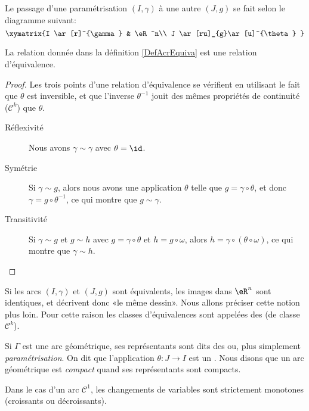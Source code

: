Le passage d'une paramétrisation $(I,\gamma)$ à une autre $(J,g)$ se fait selon le diagramme suivant:
\begin{equation}
    \xymatrix{%
    I \ar[r]^{\gamma}   &   \eR^n\\
    J \ar[ru]_{g}\ar[u]^{\theta}    
       }
\end{equation}

\begin{proposition}
    La relation donnée dans la définition \ref{DefAcrEquiva} est une relation d'équivalence.
\end{proposition}

\begin{proof}
    Les trois points d'une relation d'équivalence se vérifient en utilisant le fait que $\theta$ est inversible, et que l'inverse $\theta^{-1}$ jouit des mêmes propriétés de continuité ($\mathcal{C}^k$) que $\theta$. 
    \begin{description}
        \item[Réflexivité] Nous avons $\gamma\sim \gamma$ avec $\theta=\id$.
        \item[Symétrie] Si $\gamma\sim g$, alors nous avons une application $\theta$ telle que $g=\gamma\circ\theta$, et donc $\gamma=g\circ\theta^{-1}$, ce qui montre que $g\sim \gamma$.
        \item[Transitivité] Si $\gamma\sim g$ et $g\sim h$ avec $g=\gamma\circ\theta$ et $h=g\circ\omega$, alors $h=\gamma\circ(\theta\circ\omega)$, ce qui montre que $\gamma\sim h$.
    \end{description}
\end{proof}
Si les arcs $(I,\gamma)$ et $(J,g)$ sont équivalents, les images dans $\eR^n$ sont identiques, et décrivent donc «le même dessin». Nous allons préciser cette notion plus loin. Pour cette raison les classes d'équivalences sont appelées des  (de classe $\mathcal{C}^k$).

Si $\Gamma$ est une arc géométrique, ses représentants sont dits des  ou, plus simplement \emph{paramétrisation}. On dit que l'application $\theta\colon J\to I$ est un . Nous disons que un arc géométrique est \emph{compact} quand ses représentants sont compacts.


\begin{lemma}       \label{LemChamVarsStriMomnot}
    Dans le cas d'un arc $\mathcal{C}^1$, les changements de variables sont strictement monotones (croissants ou décroissants).
\end{lemma}

